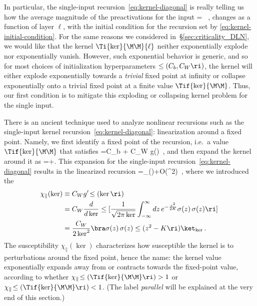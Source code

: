 In particular, the single-input recursion~\eqref{eq:kernel-diagonal} is really telling us how the average magnitude of the preactivations for the input
\be\label{eq:midpoint-kernel-def}
\Ti{\ker}{\M\M}{\ell} = \le[\frac{1}{n_{\ell}}\sum_{i=1}^{n_{\ell}}\le(\z{i}{\M}{\ell}\ri)^2\ri]\, ,
\ee
changes as a function of layer $\ell$, with the initial condition for the recursion set by \eqref{eq:kernel-initial-condition}.
For the same reasons we considered in~\S\ref{sec:criticality_DLN}, we would like that the kernel $\Ti{\ker}{\M\M}{\ell}$ neither exponentially explode nor exponentially vanish.
However, such exponential behavior is generic, and so for most choices of initialization hyperparameters $\le(C_b,C_W\ri)$, the kernel will either explode exponentially towards a \emph{trivial} fixed point at infinity or collapse exponentially onto a trivial fixed point at a finite value $\Tif{\ker}{\M\M}$. Thus, our first  condition is to mitigate this exploding or collapsing kernel problem for the single input.


There is an ancient technique used to analyze nonlinear recursions such as the single-input kernel recursion~\eqref{eq:kernel-diagonal}: linearization around a fixed point.
Namely,
we first identify a fixed point of the recursion, i.e.~a value $\Tif{\ker}{\M\M}$ that satisfies
\be\label{eq:fixed_single}
\Tif{\ker}{\M\M}=C_b + C_W g\!\le(\Tif{\ker}{\M\M}\ri)\, ,
\ee
and then expand the kernel around it as 
\be\label{eq:fixed-point-expansion-Delta-K}
\KML=\Tif{\ker}{\M\M}+\Delta \KML. 
\ee
This expansion for the single-input recursion~\eqref{eq:kernel-diagonal} results in the linearized recursion
\be\label{eq:single_expand}
=\chi_{\parallel}\!\le(\Tif{\ker}{\M\M}\ri)\Ti{\Delta \ker}{\M\M}{\ell}+O\!\le(\Delta^2\ri)\, , %
\ee
where we introduced the 
\begin{align}\label{eq:chi_parallel_first}
\chi_{\parallel}(\ker)&\equiv C_W g'\!\le(\ker\ri)\, \\
&=C_W \frac{d}{d \ker}\le[\frac{1}{\sqrt{2\pi\ker}}\int_{-\infty}^{\infty} dz\,  e^{-\frac{z^2}{2K}} \sigma(z)\, \sigma(z)\ri]\, \notag \\
&=\frac{C_W}{2\ker^2} \bra \sigma(z)\,\sigma(z)\le(z^2-K\ri)\ket_{\ker}\, .\nonumber
\end{align}
The susceptibility $\chi_{\parallel}(\ker)$ characterizes how susceptible the kernel is to perturbations around the fixed point, hence the name: the kernel value exponentially expands away from or contracts towards the fixed-point value, according to whether $ \chi_{\parallel}\!\le(\Tif{\ker}{\M\M}\ri)>1$ or $\chi_{\parallel}\!\le(\Tif{\ker}{\M\M}\ri)<1$. (The label \emph{parallel} will be explained at the very end of this section.) 

